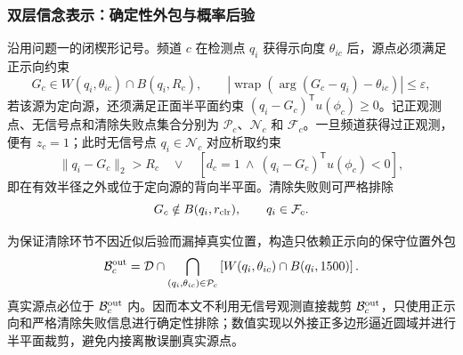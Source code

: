 \documentclass[zihao=-4,a4paper,UTF8,fontset=none]{ctexart}
\begin{document}
\subsubsection{双层信念表示：确定性外包与概率后验}

沿用问题一的闭楔形记号。频道 $c$ 在检测点 $q_i$ 获得示向度 $\theta_{ic}$ 后，源点必须满足正示向约束
\begin{equation}
G_c\in W(q_i,\theta_{ic})\cap B(q_i,R_c),
\qquad
|\operatorname{wrap}(\arg(G_c-q_i)-\theta_{ic})|\le\varepsilon,
\label{eq:q4_positive_bearing}
\end{equation}
若该源为定向源，还须满足正面半平面约束 $(q_i-G_c)^{\mathsf T}u(\phi_c)\ge0$。记正观测点、无信号点和清除失败点集合分别为 $\mathcal P_c$、$\mathcal N_c$ 和 $\mathcal F_c$。一旦频道获得过正观测，便有 $z_c=1$；此时无信号点 $q_i\in\mathcal N_c$ 对应析取约束
\begin{equation}
\|q_i-G_c\|_2>R_c
\quad\lor\quad
\left[d_c=1\ \land\ (q_i-G_c)^{\mathsf T}u(\phi_c)<0\right],
\label{eq:q4_no_signal}
\end{equation}
即在有效半径之外或位于定向源的背向半平面。清除失败则可严格排除
\begin{equation}
G_c\notin B(q_i,r_{\rm clr}),\qquad q_i\in\mathcal F_c.
\label{eq:q4_clear_failure}
\end{equation}

为保证清除环节不因近似后验而漏掉真实位置，构造只依赖正示向的保守位置外包
\begin{equation}
\mathcal B_c^{\rm out}
=\mathcal D\cap
\bigcap_{(q_i,\theta_{ic})\in\mathcal P_c}
\left[W(q_i,\theta_{ic})\cap B(q_i,1500)\right].
\label{eq:q4_outer_belief}
\end{equation}
真实源点必位于 $\mathcal B_c^{\rm out}$ 内。因而本文不利用无信号观测直接裁剪 $\mathcal B_c^{\rm out}$，只使用正示向和严格清除失败信息进行确定性排除；数值实现以外接正多边形逼近圆域并进行半平面裁剪，避免内接离散误删真实源点。
\end{document}
